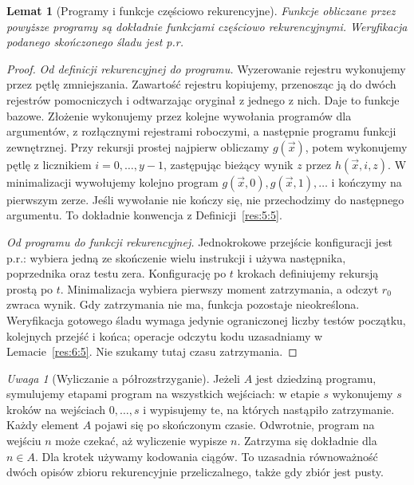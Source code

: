 \documentclass[11pt,a4paper]{article}
\numberwithin{equation}{section}
\theoremstyle{plain}
\newtheorem{lemat}[twierdzenie]{Lemat}
\theoremstyle{definition}
\theoremstyle{remark}
\newtheorem{uwaga}[twierdzenie]{Uwaga}
\begin{document}
\begin{lemat}[Programy i funkcje częściowo rekurencyjne]\label{res:6:3}
Funkcje obliczane przez powyższe programy są dokładnie funkcjami częściowo rekurencyjnymi. Weryfikacja podanego skończonego śladu jest p.r.
\end{lemat}
\begin{proof}
\emph{Od definicji rekurencyjnej do programu.} Wyzerowanie rejestru wykonujemy przez pętlę zmniejszania. Zawartość rejestru kopiujemy, przenosząc ją do dwóch rejestrów pomocniczych i odtwarzając oryginał z jednego z nich. Daje to funkcje bazowe. Złożenie wykonujemy przez kolejne wywołania programów dla argumentów, z rozłącznymi rejestrami roboczymi, a następnie programu funkcji zewnętrznej. Przy rekursji prostej najpierw obliczamy $g(\vec x)$, potem wykonujemy pętlę z licznikiem $i=0,\ldots,y-1$, zastępując bieżący wynik $z$ przez $h(\vec x,i,z)$. W minimalizacji wywołujemy kolejno program $g(\vec x,0),g(\vec x,1),\ldots$ i kończymy na pierwszym zerze. Jeśli wywołanie nie kończy się, nie przechodzimy do następnego argumentu. To dokładnie konwencja z Definicji~\ref{res:5:5}.

\emph{Od programu do funkcji rekurencyjnej.} Jednokrokowe przejście konfiguracji jest p.r.: wybiera jedną ze skończenie wielu instrukcji i używa następnika, poprzednika oraz testu zera. Konfigurację po $t$ krokach definiujemy rekursją prostą po $t$. Minimalizacja wybiera pierwszy moment zatrzymania, a odczyt $r_0$ zwraca wynik. Gdy zatrzymania nie ma, funkcja pozostaje nieokreślona. Weryfikacja gotowego śladu wymaga jedynie ograniczonej liczby testów początku, kolejnych przejść i końca; operacje odczytu kodu uzasadniamy w Lemacie~\ref{res:6:5}. Nie szukamy tutaj czasu zatrzymania.
\end{proof}

\begin{uwaga}[Wyliczanie a półrozstrzyganie]\label{res:6:4}
Jeżeli $A$ jest dziedziną programu, symulujemy etapami program na wszystkich wejściach: w etapie $s$ wykonujemy $s$ kroków na wejściach $0,\ldots,s$ i wypisujemy te, na których nastąpiło zatrzymanie. Każdy element $A$ pojawi się po skończonym czasie. Odwrotnie, program na wejściu $n$ może czekać, aż wyliczenie wypisze $n$. Zatrzyma się dokładnie dla $n\in A$. Dla krotek używamy kodowania ciągów. To uzasadnia równoważność dwóch opisów zbioru rekurencyjnie przeliczalnego, także gdy zbiór jest pusty.
\end{uwaga}
\end{document}
